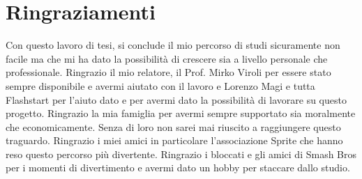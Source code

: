 \documentclass[12pt,a4paper,openright,twoside]{book}
\begin{document}
\backmatter
\cleardoublepage
{}



\chapter*{Ringraziamenti}
Con questo lavoro di tesi, si conclude il mio percorso di studi
sicuramente non facile ma che mi ha dato la possibilità di crescere sia
a livello personale che professionale.  \hfill \break
Ringrazio il mio relatore, il Prof. Mirko Viroli per essere stato sempre disponibile e avermi aiutato con il lavoro
e Lorenzo Magi e tutta Flashstart per l'aiuto dato e per avermi dato la possibilità di lavorare su questo progetto.  \hfill \break
Ringrazio la mia famiglia per avermi sempre supportato sia moralmente che economicamente. Senza
di loro non sarei mai riuscito a raggiungere questo traguardo.  \hfill \break
Ringrazio i miei amici in particolare l'associazione Sprite che hanno
reso questo percorso più divertente.
Ringrazio i bloccati e gli amici di Smash Bros per i momenti di divertimento e avermi dato un hobby per
staccare dallo studio.
\end{document}
